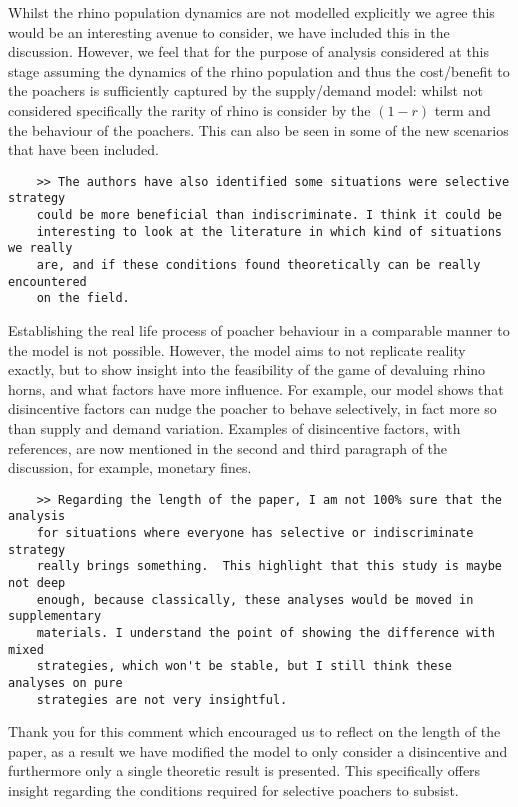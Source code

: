\documentclass[10pt]{article}
\begin{document}
Whilst the rhino population dynamics are not modelled explicitly we agree this
would be an interesting avenue to consider, we have included this in the
discussion. However, we feel that for the purpose of analysis considered at this
stage assuming the dynamics of the rhino population and thus the cost/benefit to
the poachers is sufficiently captured by the supply/demand model: whilst not
considered specifically the rarity of rhino is consider by the \((1-r)\) term
and the behaviour of the poachers. This can also be seen in some of the new
scenarios that have been included.

\begin{verbatim}
    >> The authors have also identified some situations were selective strategy
    could be more beneficial than indiscriminate. I think it could be
    interesting to look at the literature in which kind of situations we really
    are, and if these conditions found theoretically can be really encountered
    on the field.
\end{verbatim}

Establishing the real life process of poacher behaviour in a comparable manner to the model is not possible. 
However, the model aims to not replicate reality exactly, but to show insight into the feasibility of the 
game of devaluing rhino horns, and what factors have more influence. For example, our model shows that disincentive factors can nudge the poacher to behave selectively, in fact more so than supply and demand variation. Examples of disincentive factors, with references, are now mentioned in the second and third paragraph of the discussion, for example, monetary fines. 


\begin{verbatim}
    >> Regarding the length of the paper, I am not 100% sure that the analysis
    for situations where everyone has selective or indiscriminate strategy
    really brings something.  This highlight that this study is maybe not deep
    enough, because classically, these analyses would be moved in supplementary
    materials. I understand the point of showing the difference with mixed
    strategies, which won't be stable, but I still think these analyses on pure
    strategies are not very insightful.
\end{verbatim}

Thank you for this comment which encouraged us to reflect on the length of the
paper, as a result we have modified the model to only consider a disincentive
and furthermore only a single theoretic result is presented. This specifically
offers insight regarding the conditions required for selective poachers to
subsist.
\end{document}
